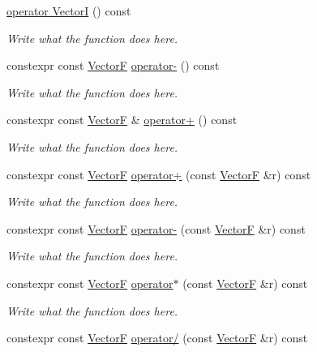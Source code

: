 \begin{DoxyCompactItemize}
\item 
\hyperlink{structVectorF_a62bcc8b79ffdf1e6e1199d46ed800d78}{operator Vector\+I} () const 
\begin{DoxyCompactList}\small\item\em Write what the function does here. \end{DoxyCompactList}\item 
constexpr const \hyperlink{structVectorF}{Vector\+F} \hyperlink{structVectorF_a797fe54dd83c9a90bf538afdc60c8a31}{operator-\/} () const 
\begin{DoxyCompactList}\small\item\em Write what the function does here. \end{DoxyCompactList}\item 
constexpr const \hyperlink{structVectorF}{Vector\+F} \& \hyperlink{structVectorF_aad820d8b74b89970df0614f2dcfdf37c}{operator+} () const 
\begin{DoxyCompactList}\small\item\em Write what the function does here. \end{DoxyCompactList}\item 
constexpr const \hyperlink{structVectorF}{Vector\+F} \hyperlink{structVectorF_adb17836d5b5d7eeba62424c1d5f109e9}{operator+} (const \hyperlink{structVectorF}{Vector\+F} \&r) const 
\begin{DoxyCompactList}\small\item\em Write what the function does here. \end{DoxyCompactList}\item 
constexpr const \hyperlink{structVectorF}{Vector\+F} \hyperlink{structVectorF_aba20ab9c050dd441a9c3d0ec5fdde8ba}{operator-\/} (const \hyperlink{structVectorF}{Vector\+F} \&r) const 
\begin{DoxyCompactList}\small\item\em Write what the function does here. \end{DoxyCompactList}\item 
constexpr const \hyperlink{structVectorF}{Vector\+F} \hyperlink{structVectorF_a78cf7b725bb7724a8a3fb503baa129d7}{operator$\ast$} (const \hyperlink{structVectorF}{Vector\+F} \&r) const 
\begin{DoxyCompactList}\small\item\em Write what the function does here. \end{DoxyCompactList}\item 
constexpr const \hyperlink{structVectorF}{Vector\+F} \hyperlink{structVectorF_abb06f54310d9754e53d22e13073a706f}{operator/} (const \hyperlink{structVectorF}{Vector\+F} \&r) const 

\end{DoxyCompactItemize}
